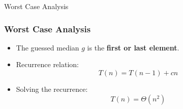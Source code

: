 \begin{frame}{Worst Case Analysis}
\frametitle{Worst Case Analysis}
\begin{itemize}
    \item The guessed median \( g \) is the \textbf{first or last element}.
    \item Recurrence relation:
        \[
        T(n) = T(n-1) + cn
        \]
    \item Solving the recurrence:
        \[
        T(n) = \Theta(n^2)
        \]
\end{itemize}
\end{frame}

%
